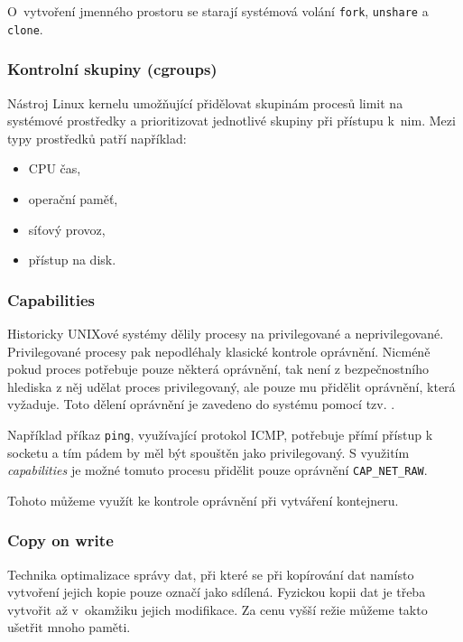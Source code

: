 
O~vytvoření jmenného prostoru se starají systémová volání \verb|fork|, \verb|unshare| a \verb|clone|.

\subsubsection{Kontrolní skupiny (cgroups)}

Nástroj Linux kernelu umožňující přidělovat skupinám procesů limit na systémové prostředky a prioritizovat jednotlivé skupiny při přístupu k~nim.
Mezi typy prostředků patří například:

\begin{itemize}
	\item CPU čas,
	\item operační paměť,
	\item síťový provoz,
	\item přístup na disk.
\end{itemize} %

\subsubsection{Capabilities}

Historicky UNIXové systémy dělily procesy na privilegované a neprivilegované.
Privilegované procesy pak nepodléhaly klasické kontrole oprávnění.
Nicméně pokud proces potřebuje pouze některá oprávnění, tak není z bezpečnostního hlediska z něj udělat proces privilegovaný, ale pouze mu přidělit oprávnění, která vyžaduje.
Toto dělení oprávnění je zavedeno do systému pomocí tzv. .

Například příkaz \verb|ping|, využívající protokol ICMP, potřebuje přímí přístup k socketu a tím pádem by měl být spouštěn jako privilegovaný.
S využitím \textit{capabilities} je možné tomuto procesu přidělit pouze oprávnění \verb|CAP_NET_RAW|.

Tohoto můžeme využít ke kontrole oprávnění při vytváření kontejneru.


\subsubsection{Copy on write}

Technika optimalizace správy dat, při které se při kopírování dat namísto vytvoření jejich kopie pouze označí jako sdílená.
Fyzickou kopii dat je třeba vytvořit až v~okamžiku jejich modifikace.
Za cenu vyšší režie můžeme takto ušetřit mnoho paměti.
\cite{copy_on_write}

